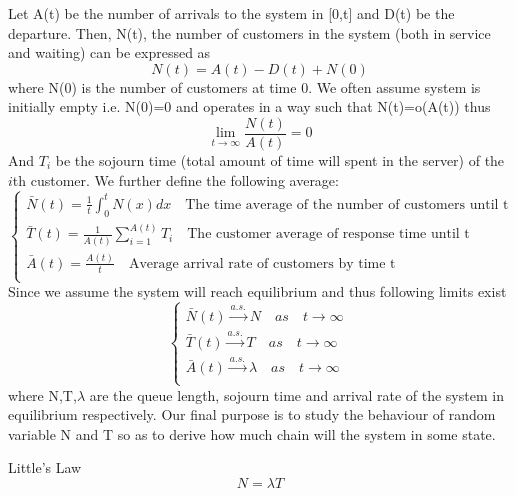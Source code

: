 \documentclass[project2.tex]{subfiles}
\begin{document}
Let A(t) be the number of arrivals to the system in [0,t] and D(t) be the departure. Then, N(t), the number of customers in the system (both in service and waiting) can be expressed as $$N(t)=A(t)-D(t)+N(0)$$ where N(0) is the number of customers at time 0. We often assume system is initially empty i.e. N(0)=0 and operates in a way such that N(t)=o(A(t)) thus $$\lim_{t\rightarrow\infty}\frac{N(t)}{A(t)}=0$$ And $T_i$ be the sojourn time (total amount of time will spent in the server) of the $i$th customer.
We further define the following average:  
\begin{equation*}
\left\{
\begin{array}{lcl}
\bar{N}(t)=\frac{1}{t}\int_0^tN(x)dx\quad \text{The time average of the number of customers until t}  \\
\bar{T}(t)=\frac{1}{A(t)}\sum_{i=1}^{A(t)}T_i \quad \text{The customer average of response time until t} \\
\bar{A}(t)=\frac{A(t)}{t}\quad \text{Average arrival rate of customers by time t} \\
\end{array} 
\right.
\end{equation*} 
Since we assume the system will reach equilibrium and thus following limits exist 
\begin{equation*}
\left\{
\begin{array}{lcl}
\bar{N}(t)\overset{a.s.}{\rightarrow}N\quad as\quad t\rightarrow\infty\  \\
\bar{T}(t)\overset{a.s.}{\rightarrow}T\quad as\quad t\rightarrow\infty\ \\
\bar{A}(t)\overset{a.s.}{\rightarrow}\lambda\quad as\quad t\rightarrow\infty\ \\
\end{array} 
\right.
\end{equation*}
where N,T,$\lambda$ are the queue length, sojourn time  and arrival rate of the system in equilibrium respectively. Our final purpose is to study the behaviour of random variable N and T so as to derive how much chain will the system in some state. 
\begin{property}
Little's Law
$$N=\lambda T$$
\end{property}
\end{document}
